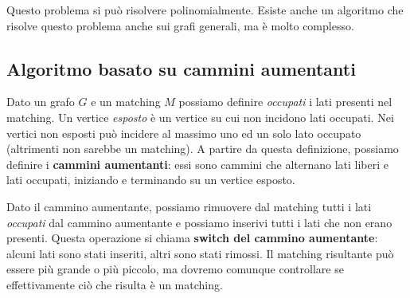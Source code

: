Questo problema si può risolvere polinomialmente. Esiste anche un algoritmo
che risolve questo problema anche sui grafi generali, ma è molto complesso.

\subsection{Algoritmo basato su cammini aumentanti}
Dato un grafo $G$ e un matching $M$ possiamo definire \textit{occupati}
i lati presenti nel matching. Un vertice \textit{esposto} è un vertice su
cui non incidono lati occupati. Nei vertici non esposti può incidere al massimo
uno ed un solo lato occupato (altrimenti non sarebbe un matching). A partire
da questa definizione, possiamo definire i \textbf{cammini aumentanti}:
essi sono cammini che alternano lati liberi e lati occupati, iniziando e
terminando su un vertice esposto.

Dato il cammino aumentante, possiamo rimuovere dal matching tutti i lati
\textit{occupati} dal cammino aumentante e possiamo inserivi tutti i lati che non
erano presenti. Questa operazione si chiama \textbf{switch del cammino aumentante}:
alcuni lati sono stati inseriti, altri sono stati rimossi. Il matching risultante
può essere più grande o più piccolo, ma dovremo comunque controllare se effettivamente
ciò che risulta è un matching.


